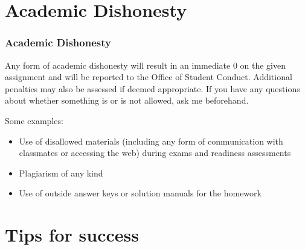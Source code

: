 \documentclass[11pt,containsverbatim,handout,xcolor=xelatex,dvipsnames,table]{beamer}
\begin{document}

\section{Academic Dishonesty}


\begin{frame}
\frametitle{Academic Dishonesty}

Any form of academic dishonesty will result in an immediate 0 on the given assignment 
and will be reported to the Office of Student Conduct. Additional penalties may also 
be assessed if deemed appropriate. If you have any questions about whether something 
is or is not allowed, ask me beforehand.

Some examples:

\begin{itemize}

\item Use of disallowed materials (including any form of communication with classmates 
or accessing the web) during exams and readiness assessments

\item Plagiarism of any kind

\item Use of outside answer keys or solution manuals for the homework

\end{itemize}

\end{frame}


\section{Tips for success}

\end{document}
